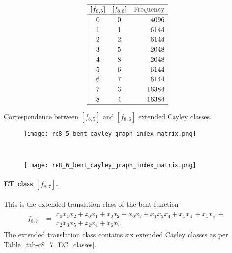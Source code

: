 \documentclass[12pt,a4paper]{article}
\begin{document}
\begin{table}[!bhpt] %
%
\small{}
\begin{align*}
\def\arraystretch{1.2}
\begin{array}{|ccr|}
\hline
[f_{8,5}] &
[f_{8,6}] &
\text{Frequency}
\\
\hline
  0 &    0 &  4096
\\
  1 &    1 &  6144
\\
  2 &    2 &  6144
\\
  3 &    5 &  2048
\\
  4 &    8 &  2048
\\
  5 &    6 &  6144
\\
  6 &    7 &  6144
\\
  7 &    3 & 16384
\\
  8 &    4 & 16384
\\
\hline
\end{array}
\end{align*}
\caption{Correspondence between $[f_{8,5}]$ and $[f_{8,6}]$ extended Cayley classes.}
\label{tab-c8_5-c8_6_EC_classes}
\end{table}

\begin{figure}[!bhpt] %
\centering
\begin{minipage}{.48\textwidth}
  \centering
  \texttt{[image: re8\_5\_bent\_cayley\_graph\_index\_matrix.png]}
  \label{fig:re8_5_bent_cayley_graph_index_matrix}
\end{minipage}
~~
\begin{minipage}{.48\textwidth}
  \centering
  \texttt{[image: re8\_6\_bent\_cayley\_graph\_index\_matrix.png]}
  \label{fig:re8_6_bent_cayley_graph_index_matrix}
\end{minipage}
\end{figure}

\newpage
\paragraph*{ET class $[f_{8,7}]$.}
%
This is the extended translation class of the bent function
\small{}
\begin{align*}
f_{ 8 , 7 } &=
\begin{array}{l}
x_{0} x_{1} x_{2} + x_{0} x_{1} + x_{0} x_{2} + x_{0} x_{3} + x_{1} x_{3} x_{4} + x_{1} x_{4}\, +
x_{1} x_{5}\, +
\\
x_{2} x_{3} x_{5} + x_{2} x_{4} + x_{6} x_{7}.
\end{array}
\end{align*}
\normalsize{}
The extended translation class contains six extended Cayley classes as per Table~\ref{tab-c8_7_EC_classes}.
\end{document}
